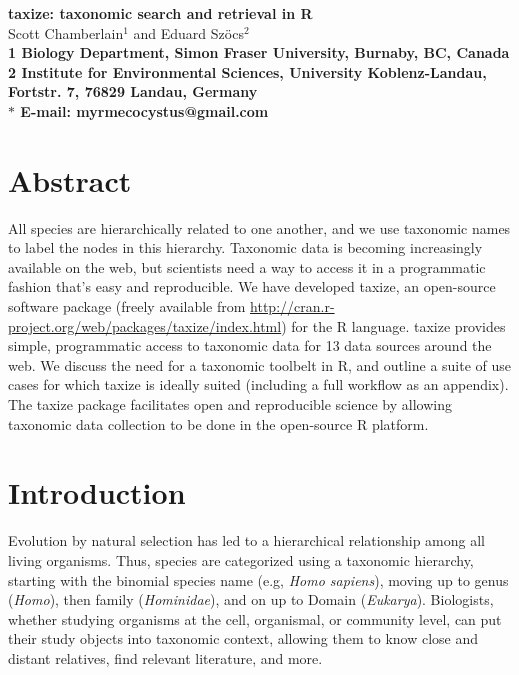 \documentclass[10pt]{article}\usepackage[]{graphicx}\usepackage[]{color}
\date{}
\begin{document}
\begin{flushleft}
{\Large
\textbf{taxize: taxonomic search and retrieval in R}
}
\\
Scott Chamberlain$^{1}$ and 
Eduard Sz\"{o}cs$^{2}$
\\
\bf{1} Biology Department, Simon Fraser University, Burnaby, BC, Canada
\\
\bf{2} Institute for Environmental Sciences, University Koblenz-Landau, Fortstr. 7, 76829 Landau, Germany
\\
$\ast$ E-mail: myrmecocystus@gmail.com
\end{flushleft}

\section*{Abstract}
All species are hierarchically related to one another, and we use taxonomic names to label the nodes in this hierarchy. Taxonomic data is becoming increasingly available on the web, but scientists need a way to access it in a programmatic fashion that's easy and reproducible. We have developed taxize, an open-source software package (freely available from \url{http://cran.r-project.org/web/packages/taxize/index.html}) for the R language. taxize provides simple, programmatic access to taxonomic data for 13 data sources around the web. We discuss the need for a taxonomic toolbelt in R, and outline a suite of use cases for which taxize is ideally suited (including a full workflow as an appendix). The taxize package facilitates open and reproducible science by allowing taxonomic data collection to be done in the open-source R platform.


\section*{Introduction}
Evolution by natural selection has led to a hierarchical relationship among all living organisms.  Thus, species are categorized using a taxonomic hierarchy, starting with the binomial species name (e.g, \emph{Homo sapiens}), moving up to genus (\emph{Homo}), then family (\emph{Hominidae}), and on up to Domain (\emph{Eukarya}). Biologists, whether studying organisms at the cell, organismal, or community level, can put their study objects into taxonomic context, allowing them to know close and distant relatives, find relevant literature, and more. 
\end{document}
